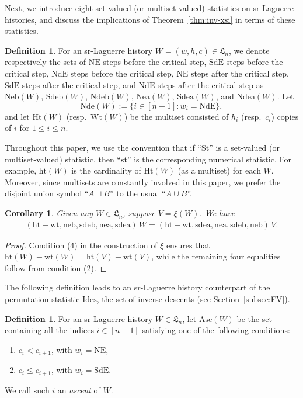 \documentclass[12pt]{amsart}
\numberwithin{equation}{section}
\theoremstyle{plain}
\newtheorem{corollary}[theorem]{Corollary}
\theoremstyle{definition}
\newtheorem{Def}[theorem]{Definition}
\def\LH{\mathfrak{L}}
\def\NE{\mathrm{NE}}
\def\SdE{\mathrm{SdE}}
\def\NdE{\mathrm{NdE}}
\def\neb{\mathrm{neb}}
\def\nea{\mathrm{nea}}
\def\sdeb{\mathrm{sdeb}}
\def\sdea{\mathrm{sdea}}
\def\het{\mathrm{ht}}
\def\wt{\mathrm{wt}}
\def\Neb{\mathrm{Neb}}
\def\Nea{\mathrm{Nea}}
\def\Sdeb{\mathrm{Sdeb}}
\def\Sdea{\mathrm{Sdea}}
\def\Ndeb{\mathrm{Ndeb}}
\def\Ndea{\mathrm{Ndea}}
\def\Nde{\mathrm{Nde}}
\def\Het{\mathrm{Ht}}
\def\Wt{\mathrm{Wt}}
\def\Asc{\mathrm{Asc}}
\def\Id{\mathrm{Ides}}
\begin{document}
Next, we introduce eight set-valued (or multiset-valued) statistics on sr-Laguerre histories, and discuss the implications of Theorem~\ref{thm:inv-xsi} in terms of these statistics.

\begin{Def}
For an sr-Laguerre history $W=(w,h,c)\in\LH_n$, we denote respectively the sets of $\NE$ steps before the critical step, $\SdE$ steps before the critical step, $\NdE$ steps before the critical step, $\NE$ steps after the critical step, $\SdE$ steps after the critical step, and $\NdE$ steps after the critical step as $\Neb(W)$, $\Sdeb(W)$, $\Ndeb(W)$, $\Nea(W)$, $\Sdea(W)$, and $\Ndea(W)$. Let
$$\Nde(W):=\{i\in[n-1]: w_i=\NdE\},
$$ and let $\Het(W)$ (resp.~$\Wt(W)$) be the multiset consisted of $h_i$ (resp.~$c_i$) copies of $i$ for $1 \leq i \leq n$.
\end{Def}

Throughout this paper, we use the convention that if ``St'' is a set-valued (or multiset-valued) statistic, then ``st'' is the corresponding numerical statistic. For example, $\het(W)$ is the cardinality of $\Het(W)$ (as a multiset) for each $W$. Moreover, since multisets are constantly involved in this paper, we prefer the disjoint union symbol ``$A\sqcup B$'' to the usual ``$A\cup B$''.

\begin{corollary}\label{coro:num only}
Given any $W\in\LH_n$, suppose $V=\xi(W)$. We have
\begin{align}
(\het-\wt,\neb,\sdeb,\nea,\sdea)\,W = (\het-\wt,\sdea,\nea,\sdeb,\neb)\,V.
\end{align}
\end{corollary}
\begin{proof}
Condition (4) in the construction of $\xi$ ensures that $\het(W)-\wt(W)=\het(V)-\wt(V)$, while the remaining four equalities follow from condition (2).
\end{proof}

The following definition leads to an sr-Laguerre history counterpart of the permutation statistic $\Id$, the set of inverse descents (see Section~\ref{subsec:FV}).

\begin{Def}
For an sr-Laguerre history $W\in\LH_n$, let $\Asc(W)$ be the
set containing all the indices $i\in[n-1]$ satisfying one of the following conditions:
\begin{enumerate}
	\item $c_i<c_{i+1}$, with $w_i=\NE$,
	\item $c_i\le c_{i+1}$, with $w_{i}=\SdE$.
\end{enumerate}
We call such $i$ an {\it ascent} of $W$.
\end{Def}
\end{document}
